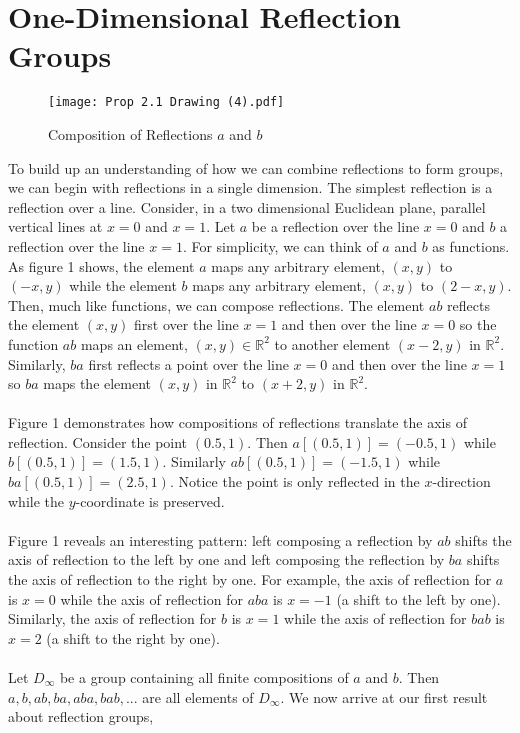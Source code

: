 \documentclass{article}
\theoremstyle{definition}
\begin{document}
\section*{One-Dimensional Reflection Groups}
\noindent \begin{wrapfigure}{r}{0.5\textwidth}
  \begin{center}
    \texttt{[image: Prop 2.1 Drawing (4).pdf]}
  \end{center}
  \caption{Composition of Reflections $a$ and $b$}
\end{wrapfigure}To build up an understanding of how we can combine reflections to form groups, we can begin with reflections in a single dimension. The simplest reflection is a reflection over a line. Consider, in a two dimensional Euclidean plane, parallel vertical lines at $x = 0$ and $x = 1$. Let $a$ be a reflection over the line $x = 0$ and $b$ a reflection over the line $x = 1$. For simplicity, we can think of $a$ and $b$ as functions. As figure 1 shows, the element $a$ maps any arbitrary element, $(x,y)$ to $(-x,y)$ while the element $b$ maps any arbitrary element, $(x,y)$ to $(2-x,y)$. Then, much like functions, we can compose reflections. The element $ab$ reflects the element $(x,y)$ first over the line $x = 1$ and then over the line $x = 0$ so the function $ab$ maps an element, $(x,y)\in\mathbb{R}^2$ to another element $(x-2,y)$ in $\mathbb{R}^2$. Similarly, $ba$ first reflects a point over the line $x = 0$ and then over the line $x = 1$ so $ba$ maps the element $(x,y)$ in $\mathbb{R}^2$ to $(x+2,y)$ in $\mathbb{R}^2$.\\
\\
Figure 1 demonstrates how compositions of reflections translate the axis of reflection. Consider the point $(0.5, 1)$. Then $a[(0.5, 1)] = (-0.5, 1)$ while $b[(0.5,1)]=(1.5,1)$. Similarly $ab[(0.5,1)] = (-1.5, 1)$  while $ba[(0.5,1)] =  (2.5, 1)$. Notice the point is only reflected in the $x$-direction while the $y$-coordinate is preserved.\\
\\
Figure 1 reveals an interesting pattern: left composing a reflection by $ab$ shifts the axis of reflection to the left by one and left composing the reflection by $ba$ shifts the axis of reflection to the right by one. For example, the axis of reflection for $a$ is $x = 0$ while the axis of reflection for $aba$ is $x= -1$ (a shift to the left by one). Similarly, the axis of reflection for $b$ is $x = 1$ while the axis of reflection for $bab$ is $x = 2$ (a shift to the right by one).\\
\\
Let $D_{\infty}$ be a group containing all finite compositions of $a$ and $b$. Then $a, b, ab, ba, aba, bab, ...$ are all elements of $D_{\infty}$. We now arrive at our first result about reflection groups,
\end{document}
